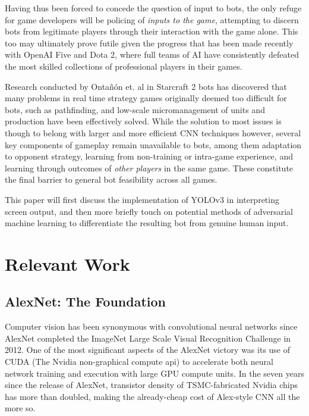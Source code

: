 \documentclass[sigconf]{acmart}
\begin{document}
Having thus been forced to concede the question of input to bots, the only refuge for game developers will be policing of \textit{inputs to the game}, attempting to discern bots from legitimate players through their interaction with the game alone. This too may ultimately prove futile given the progress that has been made recently with OpenAI Five and Dota 2, where full teams of AI have consistently defeated the most skilled collections of professional players in their games. \cite{OpenAI}

Research conducted by Ontañón et. al in Starcraft 2 bots has discovered that many problems in real time strategy games originally deemed too difficult for bots, such as pathfinding, and low-scale micromanagement of units and production have been effectively solved.\cite{SC2} While the solution to most issues is though to belong with larger and more efficient CNN techniques however, several key components of gameplay remain unavailable to bots, among them adaptation to opponent strategy, learning from non-training or intra-game experience, and learning through outcomes of \textit{other players} in the same game. These constitute the final barrier to general bot feasibility across all games.\cite{SC2}

This paper will first discuss the implementation of YOLOv3 in interpreting screen output, and then more briefly touch on potential methods of adversarial machine learning to differentiate the resulting bot from genuine human input.

\section{Relevant Work}
\subsection{AlexNet: The Foundation}

Computer vision has been synonymous with convolutional neural networks since AlexNet completed the ImageNet Large Scale Visual Recognition Challenge in 2012. \cite{AlexNet} One of the most significant aspects of the AlexNet victory was its use of CUDA (The Nvidia non-graphical compute api) to accelerate both neural network training and execution with large GPU compute units. In the seven years since the release of AlexNet, transistor density of TSMC-fabricated Nvidia chips has more than doubled, making the already-cheap cost of Alex-style CNN all the more so.\cite{Nvidia10}
\end{document}
